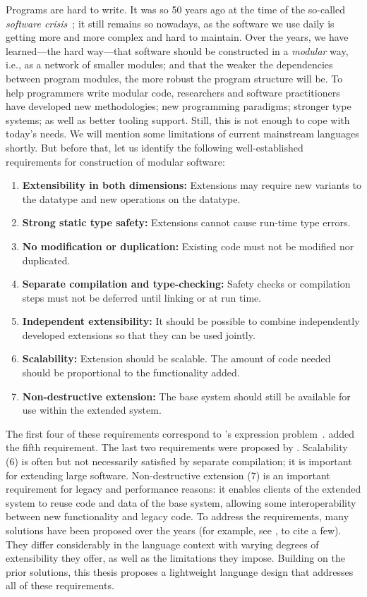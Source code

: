 Programs are hard to write. It was so 50 years ago at the time of the so-called
\textit{software crisis}~\citep{Naur:1969:SER:1102020}; it still remains so
nowadays, as the software we use daily is getting more and more complex and hard
to maintain. Over the years, we have learned---the hard way---that software
should be constructed in a \textit{modular} way, i.e., as a network of smaller
modules; and that the weaker the dependencies between program modules, the more
robust the program structure will be. To help programmers write modular code,
researchers and software practitioners have developed new methodologies; new
programming paradigms; stronger type systems; as well as better tooling
support. Still, this is not enough to cope with today's needs. We will mention
some limitations of current mainstream languages shortly. But before that, let
us identify the following well-established requirements for construction of
modular software:
\begin{enumerate}
\item \textbf{Extensibility in both dimensions:} Extensions may require new
  variants to the datatype and new operations on the datatype.
\item \textbf{Strong static type safety:} Extensions cannot cause run-time type errors.
\item \textbf{No modification or duplication:} Existing code must not be
  modified nor duplicated.
\item \textbf{Separate compilation and type-checking:} Safety checks or
  compilation steps must not be deferred until linking or at run time.
\item \textbf{Independent extensibility:} It should be possible to combine
  independently developed extensions so that they can be used jointly.
\item \textbf{Scalability:} Extension should be scalable. The amount of code
  needed should be proportional to the functionality added.
\item \textbf{Non-destructive extension:} The base system should still be
  available for use within the extended system.
\end{enumerate}
The first four of these requirements correspond to
\citeauthor{wadler1998expression}'s expression
problem~\citep{wadler1998expression}. \citet{Zenger-Odersky2005} added the fifth
requirement. The last two requirements were proposed by \citet{Nystrom:2006}.
Scalability (6) is often but not necessarily satisfied by separate compilation;
it is important for extending large software. Non-destructive extension (7) is
an important requirement for legacy and performance reasons: it enables clients
of the extended system to reuse code and data of the base system, allowing some
interoperability between new functionality and legacy code. To address the
requirements, many solutions have been proposed over the years (for example, see
\citet{oliveira2012extensibility, wang2016expression, oliveira09modular,
  swierstra_2008, Zenger-Odersky2005}, to cite a few). They differ considerably
in the language context with varying degrees of extensibility they offer, as
well as the limitations they impose. Building on the prior solutions, this
thesis proposes a lightweight language design that addresses all of these
requirements.

